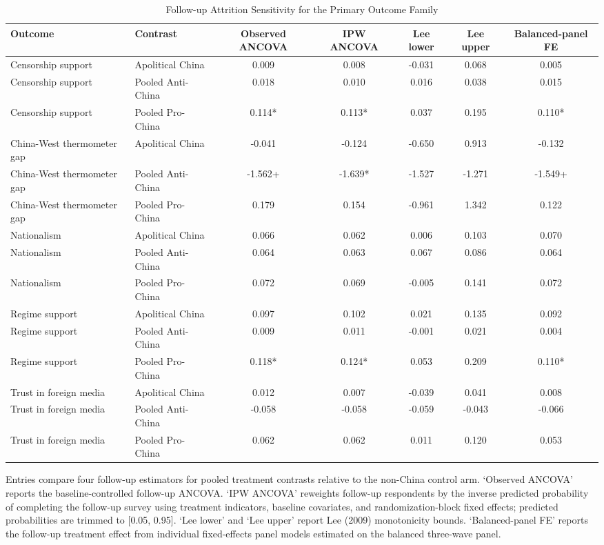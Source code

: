 \begin{table}[H]
\centering
\caption{Follow-up Attrition Sensitivity for the Primary Outcome Family}
\label{tab:t2_attrition_sensitivity}
\footnotesize
\begin{threeparttable}
\begin{tabular}{llccccc}
\toprule
Outcome & Contrast & Observed ANCOVA & IPW ANCOVA & Lee lower & Lee upper & Balanced-panel FE \\
\midrule
Censorship support & Apolitical China & 0.009 & 0.008 & -0.031 & 0.068 & 0.005 \\
Censorship support & Pooled Anti-China & 0.018 & 0.010 & 0.016 & 0.038 & 0.015 \\
Censorship support & Pooled Pro-China & 0.114* & 0.113* & 0.037 & 0.195 & 0.110* \\
China-West thermometer gap & Apolitical China & -0.041 & -0.124 & -0.650 & 0.913 & -0.132 \\
China-West thermometer gap & Pooled Anti-China & -1.562+ & -1.639* & -1.527 & -1.271 & -1.549+ \\
China-West thermometer gap & Pooled Pro-China & 0.179 & 0.154 & -0.961 & 1.342 & 0.122 \\
Nationalism & Apolitical China & 0.066 & 0.062 & 0.006 & 0.103 & 0.070 \\
Nationalism & Pooled Anti-China & 0.064 & 0.063 & 0.067 & 0.086 & 0.064 \\
Nationalism & Pooled Pro-China & 0.072 & 0.069 & -0.005 & 0.141 & 0.072 \\
Regime support & Apolitical China & 0.097 & 0.102 & 0.021 & 0.135 & 0.092 \\
Regime support & Pooled Anti-China & 0.009 & 0.011 & -0.001 & 0.021 & 0.004 \\
Regime support & Pooled Pro-China & 0.118* & 0.124* & 0.053 & 0.209 & 0.110* \\
Trust in foreign media & Apolitical China & 0.012 & 0.007 & -0.039 & 0.041 & 0.008 \\
Trust in foreign media & Pooled Anti-China & -0.058 & -0.058 & -0.059 & -0.043 & -0.066 \\
Trust in foreign media & Pooled Pro-China & 0.062 & 0.062 & 0.011 & 0.120 & 0.053 \\
\bottomrule
\end{tabular}
\begin{tablenotes}[flushleft]
\footnotesize
\item Entries compare four follow-up estimators for pooled treatment contrasts relative to the non-China control arm. `Observed ANCOVA' reports the baseline-controlled follow-up ANCOVA. `IPW ANCOVA' reweights follow-up respondents by the inverse predicted probability of completing the follow-up survey using treatment indicators, baseline covariates, and randomization-block fixed effects; predicted probabilities are trimmed to [0.05, 0.95]. `Lee lower' and `Lee upper' report Lee (2009) monotonicity bounds. `Balanced-panel FE' reports the follow-up treatment effect from individual fixed-effects panel models estimated on the balanced three-wave panel.
\end{tablenotes}
\end{threeparttable}
\end{table}
